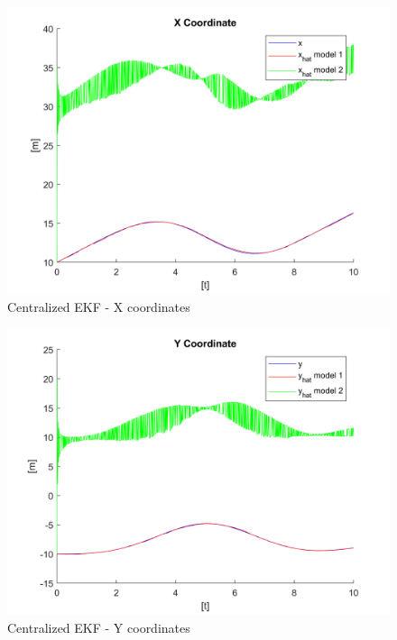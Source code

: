 \documentclass[conference]{IEEEtran}
\begin{document}
\begin{figure}[H]
 \includegraphics[width=\linewidth]{dwg/centralized-x-coord.png}
  \caption{Centralized EKF - X coordinates}
 
\end{figure}

\begin{figure}[H]
 \includegraphics[width=\linewidth]{dwg/centralized-y-coord.png}
  \caption{Centralized EKF - Y coordinates}
 
\end{figure}
\end{document}
